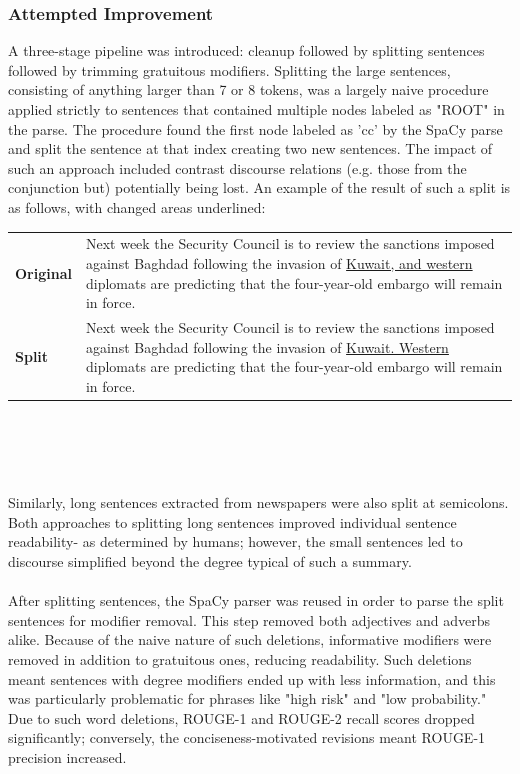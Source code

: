 \documentclass[11pt,a4paper]{article}
\begin{document}
\subsubsection{Attempted Improvement}
A three-stage pipeline was introduced: cleanup followed by splitting sentences followed by trimming gratuitous modifiers. Splitting the large sentences, consisting of anything larger than 7 or 8 tokens, was a largely naive procedure applied strictly to sentences that contained multiple nodes labeled as "ROOT" in the parse. The procedure found the first node labeled as 'cc' by the SpaCy parse and split the sentence at that index creating two new sentences. The impact of such an approach included contrast discourse relations (e.g. those from the conjunction but) potentially being lost. An example of the result of such a split is as follows, with changed areas underlined:\\

\begin{tabular}{l p{55mm}}
\textbf{Original} & Next week the Security Council is to review the sanctions imposed against Baghdad following the invasion of \underline{Kuwait, and western} diplomats are predicting that the four-year-old embargo will remain in force.\\
\textbf{Split} & Next week the Security Council is to review the sanctions imposed against Baghdad following the invasion of \underline{Kuwait. Western} diplomats are predicting that the four-year-old embargo will remain in force.
\end{tabular}\\ \\ \\ \\
Similarly, long sentences extracted from newspapers were also split at semicolons. Both approaches to splitting long sentences improved individual sentence readability- as determined by humans; however, the small sentences led to discourse simplified beyond the degree typical of such a summary.\\ \\
After splitting sentences, the SpaCy parser was reused in order to parse the split sentences for modifier removal. This step removed both adjectives and adverbs alike. Because of the naive nature of such deletions, informative modifiers were removed in addition to gratuitous ones, reducing readability. Such deletions meant sentences with degree modifiers ended up with less information, and this was particularly problematic for phrases like "high risk" and "low probability." Due to such word deletions, ROUGE-1 and ROUGE-2 recall scores dropped significantly; conversely, the conciseness-motivated revisions meant ROUGE-1 precision increased.
\end{document}
